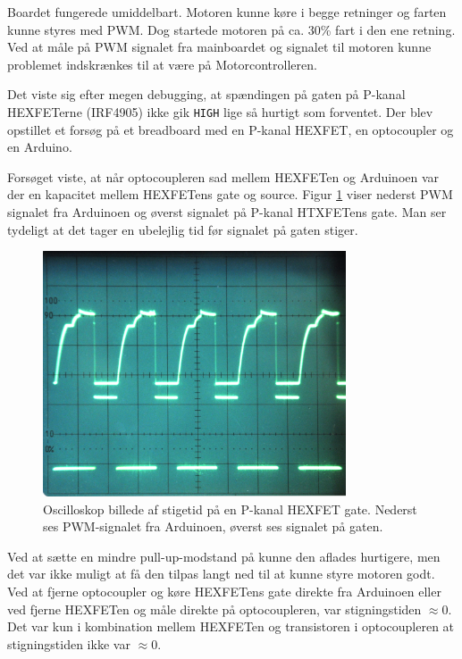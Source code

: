 \documentclass[a4paper,twoside,article,danish,table]{memoir}
\begin{document}

Boardet fungerede umiddelbart. Motoren kunne køre i begge retninger og farten kunne styres med PWM. Dog startede motoren på ca. 30\% fart i den ene retning. Ved at måle på PWM signalet fra mainboardet og signalet til motoren kunne problemet indskrænkes til at være på Motorcontrolleren.

Det viste sig efter megen debugging, at spændingen på gaten på P-kanal HEXFETerne (IRF4905) ikke gik \texttt{HIGH} lige så hurtigt som forventet. Der blev opstillet et forsøg på et breadboard med en P-kanal HEXFET, en optocoupler og en Arduino.


Forsøget viste, at når optocoupleren sad mellem HEXFETen og Arduinoen var der en kapacitet mellem HEXFETens gate og source. Figur \ref{fig:stigetid} viser nederst PWM signalet fra Arduinoen og øverst signalet på P-kanal HTXFETens gate. Man ser tydeligt at det tager en ubelejlig tid før signalet på gaten stiger.
\begin{figure}[htbp]
  \centering
  \includegraphics[width=0.8\textwidth]{pictures/stigetid.jpg}
  \caption[Oscilloskop billede af stigetid på en P-kanal HEXFET gate]{Oscilloskop billede af stigetid på en P-kanal HEXFET gate. Nederst ses PWM-signalet fra Arduinoen, øverst ses signalet på gaten.}
  \label{fig:stigetid}
\end{figure}

Ved at sætte en mindre pull-up-modstand på kunne den aflades hurtigere, men det var ikke muligt at få den tilpas langt ned til at kunne styre motoren godt. Ved at fjerne optocoupler og køre HEXFETens gate direkte fra Arduinoen eller ved fjerne HEXFETen og måle direkte på optocoupleren, var stigningstiden $\approx0$. Det var kun i kombination mellem HEXFETen og transistoren i optocoupleren at stigningstiden ikke var $\approx0$.
\end{document}
